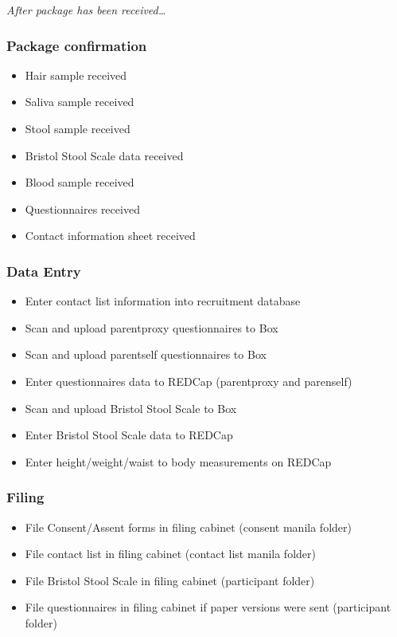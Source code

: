 \documentclass[
]{book}
\providecommand{\tightlist}{%
  \setlength{\itemsep}{0pt}\setlength{\parskip}{0pt}}
\begin{document}
\emph{After package has been received\ldots{}}

\hypertarget{package-confirmation-1}{%
\subsubsection{Package confirmation}\label{package-confirmation-1}}

\begin{itemize}
\tightlist
\item
  Hair sample received
\item
  Saliva sample received
\item
  Stool sample received
\item
  Bristol Stool Scale data received
\item
  Blood sample received
\item
  Questionnaires received
\item
  Contact information sheet received
\end{itemize}

\hypertarget{data-entry-5}{%
\subsubsection{Data Entry}\label{data-entry-5}}

\begin{itemize}
\tightlist
\item
  Enter contact list information into recruitment database
\item
  Scan and upload parentproxy questionnaires to Box
\item
  Scan and upload parentself questionnaires to Box
\item
  Enter questionnaires data to REDCap (parentproxy and parenself)
\item
  Scan and upload Bristol Stool Scale to Box
\item
  Enter Bristol Stool Scale data to REDCap
\item
  Enter height/weight/waist to body measurements on REDCap
\end{itemize}

\hypertarget{filing-7}{%
\subsubsection{Filing}\label{filing-7}}

\begin{itemize}
\tightlist
\item
  File Consent/Assent forms in filing cabinet (consent manila folder)
\item
  File contact list in filing cabinet (contact list manila folder)
\item
  File Bristol Stool Scale in filing cabinet (participant folder)
\item
  File questionnaires in filing cabinet if paper versions were sent (participant folder)
\end{itemize}
\end{document}
